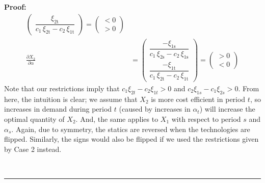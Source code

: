 \documentclass[11pt,a4paper]{extarticle}
\newenvironment{proof}[1][Proof]{\noindent\textbf{#1:} }{\ \rule{0.5em}{0.5em}}
\begin{document}
\begin{proof}
\begin{align*}
\begin{pmatrix}
	\dfrac{\xi _{\mathrm{2t}}}{c_{1}\,\xi _{\mathrm{2t}}-c_{2}\,\xi _{\mathrm{1t}}}
	\end{pmatrix}
	=
	\begin{pmatrix}
	< 0 \\
	> 0 
	\end{pmatrix} \\
	\frac{\partial X_2}{\partial \alpha} &= 
	\begin{pmatrix}
	\dfrac{-\xi _{\mathrm{1s}}}{c_{1}\,\xi _{\mathrm{2s}}-c_{2}\,\xi _{\mathrm{1s}}} \\
	\dfrac{-\xi _{\mathrm{1t}}}{c_{1}\,\xi _{\mathrm{2t}}-c_{2}\,\xi _{\mathrm{1t}}}
	\end{pmatrix}
	=
	\begin{pmatrix}
	> 0 \\
	< 0 
	\end{pmatrix}
	\end{align*}
	Note that our restrictions imply that $c_1 \xi_{2t} - c_2 \xi_{1t} > 0$ and $c_2 \xi_{1s} - c_1 \xi_{2s} > 0$. From here, the intuition is clear; we assume that $X_2$ is more cost efficient in period $t$, so increases in demand during period $t$ (caused by increases in $\alpha_t$) will increase the optimal quantity of $X_2$. And, the same applies to $X_1$ with respect to period $s$ and $\alpha_s$. Again, due to symmetry, the statics are reversed when the technologies are flipped. Similarly, the signs would also be flipped if we used the restrictions given by Case 2 instead. 
	

\end{proof}
\end{document}
